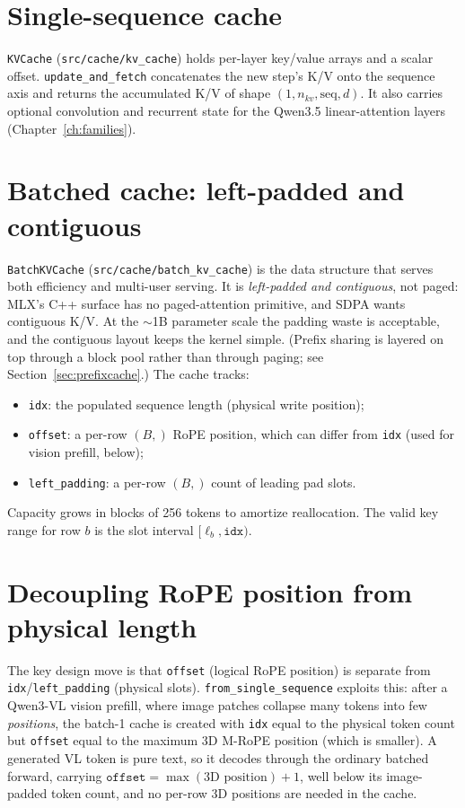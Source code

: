 \documentclass[11pt,a4paper]{report}
\newcommand{\code}[1]{\texttt{#1}}
\begin{document}
\section{Single-sequence cache}
\code{KVCache} (\code{src/cache/kv\_cache}) holds per-layer key/value arrays and a
scalar offset. \code{update\_and\_fetch} concatenates the new step's K/V onto the
sequence axis and returns the accumulated K/V of shape
$(1, n_{kv}, \text{seq}, d)$. It also carries optional convolution and recurrent
state for the Qwen3.5 linear-attention layers (Chapter~\ref{ch:families}).

\section{Batched cache: left-padded and contiguous}
\code{BatchKVCache} (\code{src/cache/batch\_kv\_cache}) is the data structure that
serves both efficiency and multi-user serving. It is \emph{left-padded and
contiguous}, not paged: MLX's C++ surface has no paged-attention primitive, and SDPA
wants contiguous K/V. At the $\sim$1B parameter scale the padding waste is
acceptable, and the contiguous layout keeps the kernel simple. (Prefix sharing is
layered on top through a block pool rather than through paging; see
Section~\ref{sec:prefixcache}.) The cache tracks:
\begin{itemize}[nosep]
  \item \code{idx}: the populated sequence length (physical write position);
  \item \code{offset}: a per-row $(B,)$ RoPE position, which can differ from
        \code{idx} (used for vision prefill, below);
  \item \code{left\_padding}: a per-row $(B,)$ count of leading pad slots.
\end{itemize}
Capacity grows in blocks of 256 tokens to amortize reallocation. The valid key range
for row $b$ is the slot interval $[\ell_b, \code{idx})$.

\section{Decoupling RoPE position from physical length}
The key design move is that \code{offset} (logical RoPE position) is separate from
\code{idx}/\code{left\_padding} (physical slots). \code{from\_single\_sequence}
exploits this: after a Qwen3-VL vision prefill, where image patches collapse many
tokens into few \emph{positions}, the batch-1 cache is created with
\code{idx} equal to the physical token count but \code{offset} equal to the maximum
3D M-RoPE position (which is smaller). A generated VL token is pure text, so it
decodes through the ordinary batched forward, carrying
$\code{offset} = \max(\text{3D position}) + 1$, well below its image-padded token
count, and no per-row 3D positions are needed in the cache.
\end{document}
